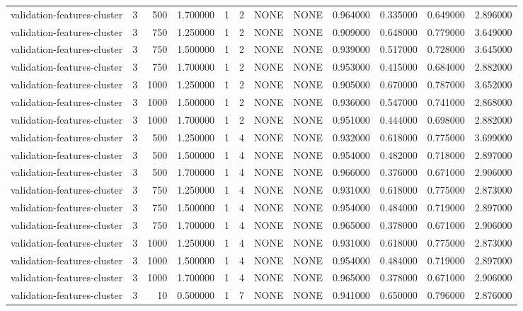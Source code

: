 \begin{tabular}{lrrrllllrrrr}
validation-features-cluster & 3 & 500 & 1.700000 & 1 & 2 & NONE & NONE & 0.964000 & 0.335000 & 0.649000 & 2.896000 \\
validation-features-cluster & 3 & 750 & 1.250000 & 1 & 2 & NONE & NONE & 0.909000 & 0.648000 & 0.779000 & 3.649000 \\
validation-features-cluster & 3 & 750 & 1.500000 & 1 & 2 & NONE & NONE & 0.939000 & 0.517000 & 0.728000 & 3.645000 \\
validation-features-cluster & 3 & 750 & 1.700000 & 1 & 2 & NONE & NONE & 0.953000 & 0.415000 & 0.684000 & 2.882000 \\
validation-features-cluster & 3 & 1000 & 1.250000 & 1 & 2 & NONE & NONE & 0.905000 & 0.670000 & 0.787000 & 3.652000 \\
validation-features-cluster & 3 & 1000 & 1.500000 & 1 & 2 & NONE & NONE & 0.936000 & 0.547000 & 0.741000 & 2.868000 \\
validation-features-cluster & 3 & 1000 & 1.700000 & 1 & 2 & NONE & NONE & 0.951000 & 0.444000 & 0.698000 & 2.882000 \\
validation-features-cluster & 3 & 500 & 1.250000 & 1 & 4 & NONE & NONE & 0.932000 & 0.618000 & 0.775000 & 3.699000 \\
validation-features-cluster & 3 & 500 & 1.500000 & 1 & 4 & NONE & NONE & 0.954000 & 0.482000 & 0.718000 & 2.897000 \\
validation-features-cluster & 3 & 500 & 1.700000 & 1 & 4 & NONE & NONE & 0.966000 & 0.376000 & 0.671000 & 2.906000 \\
validation-features-cluster & 3 & 750 & 1.250000 & 1 & 4 & NONE & NONE & 0.931000 & 0.618000 & 0.775000 & 2.873000 \\
validation-features-cluster & 3 & 750 & 1.500000 & 1 & 4 & NONE & NONE & 0.954000 & 0.484000 & 0.719000 & 2.897000 \\
validation-features-cluster & 3 & 750 & 1.700000 & 1 & 4 & NONE & NONE & 0.965000 & 0.378000 & 0.671000 & 2.906000 \\
validation-features-cluster & 3 & 1000 & 1.250000 & 1 & 4 & NONE & NONE & 0.931000 & 0.618000 & 0.775000 & 2.873000 \\
validation-features-cluster & 3 & 1000 & 1.500000 & 1 & 4 & NONE & NONE & 0.954000 & 0.484000 & 0.719000 & 2.897000 \\
validation-features-cluster & 3 & 1000 & 1.700000 & 1 & 4 & NONE & NONE & 0.965000 & 0.378000 & 0.671000 & 2.906000 \\
validation-features-cluster & 3 & 10 & 0.500000 & 1 & 7 & NONE & NONE & 0.941000 & 0.650000 & 0.796000 & 2.876000 \\

\end{tabular}
